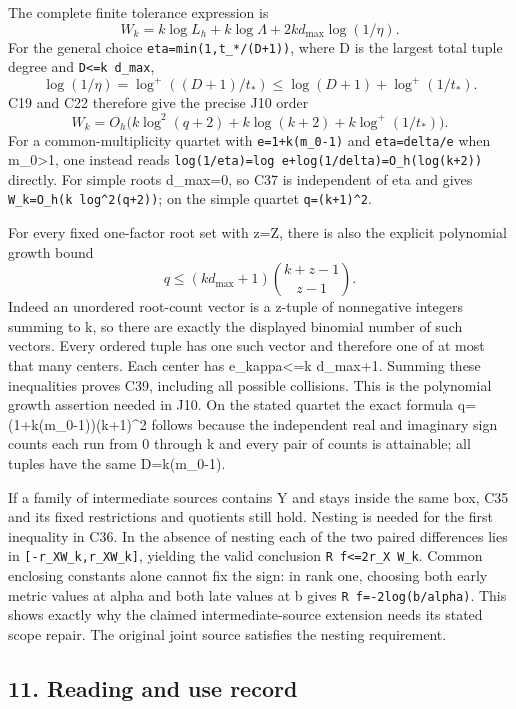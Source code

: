 \documentclass[11pt]{article}
\begin{document}
The complete finite tolerance expression is \[
W_k=k\log L_h+k\log\Lambda+2kd_{\max}\log(1/\eta).
\tag{C37}
\] For the general choice \texttt{eta=min(1,t\_*/(D+1))}, where D is the largest total tuple degree and \texttt{D\textless{}=k\ d\_max}, \[
\log(1/\eta)=\log^+((D+1)/t_*)
 \le\log(D+1)+\log^+(1/t_*).
\] C19 and C22 therefore give the precise J10 order \[
W_k=O_h\bigl(k\log^2(q+2)+k\log(k+2)
 +k\log^+(1/t_*)\bigr).
\tag{C38}
\] For a common-multiplicity quartet with \texttt{e=1+k(m\_0-1)} and \texttt{eta=delta/e} when m\_0\textgreater1, one instead reads \texttt{log(1/eta)=log\ e+log(1/delta)=O\_h(log(k+2))} directly. For simple roots d\_max=0, so C37 is independent of eta and gives \texttt{W\_k=O\_h(k\ log\^{}2(q+2))}; on the simple quartet \texttt{q=(k+1)\^{}2}.

For every fixed one-factor root set with z=\textbar Z\textbar, there is also the explicit polynomial growth bound \[
q\le(kd_{\max}+1)\binom{k+z-1}{z-1}.
\tag{C39}
\] Indeed an unordered root-count vector is a z-tuple of nonnegative integers summing to k, so there are exactly the displayed binomial number of such vectors. Every ordered tuple has one such vector and therefore one of at most that many centers. Each center has e\_kappa\textless=k d\_max+1. Summing these inequalities proves C39, including all possible collisions. This is the polynomial growth assertion needed in J10. On the stated quartet the exact formula q=(1+k(m\_0-1))(k+1)\^{}2 follows because the independent real and imaginary sign counts each run from 0 through k and every pair of counts is attainable; all tuples have the same D=k(m\_0-1).

If a family of intermediate sources contains Y and stays inside the same box, C35 and its fixed restrictions and quotients still hold. Nesting is needed for the first inequality in C36. In the absence of nesting each of the two paired differences lies in \texttt{{[}-r\_XW\_k,r\_XW\_k{]}}, yielding the valid conclusion \texttt{\textbar{}R\ f\textbar{}\textless{}=2r\_X\ W\_k}. Common enclosing constants alone cannot fix the sign: in rank one, choosing both early metric values at alpha and both late values at b gives \texttt{R\ f=-2log(b/alpha)}. This shows exactly why the claimed intermediate-source extension needs its stated scope repair. The original joint source satisfies the nesting requirement.

\subsection{11. Reading and use record}\label{reading-and-use-record}
\end{document}
